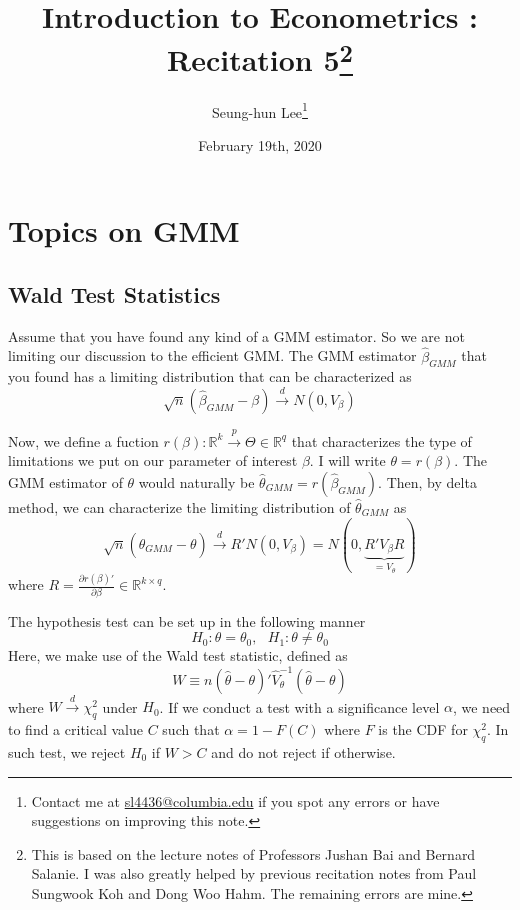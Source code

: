 \documentclass[12pt]{article}
\title{Introduction to Econometrics \ROM{2}: Recitation 5\footnote{This is based on the lecture notes of Professors Jushan Bai and Bernard Salanie. I was also greatly helped by previous recitation notes from Paul Sungwook Koh and Dong Woo Hahm. The remaining errors are mine. }}
\theoremstyle{definition}
\theoremstyle{property}
\theoremstyle{assumption}
\theoremstyle{example}
\theoremstyle{comment}
\begin{document}
\linespread{1.25}
\onehalfspacing

\author{Seung-hun Lee\footnote{Contact me at \href{mailto:sl4436@columbia.edu}{sl4436@columbia.edu} if you spot any errors or have suggestions on improving this note.}}
\date{February 19th, 2020}
\maketitle
\thispagestyle{firstpage}

\section{Topics on GMM}
\subsection{Wald Test Statistics}
Assume that you have found any kind of a GMM estimator. So we are not limiting our discussion to the efficient GMM. The GMM estimator $\hat{\beta}_{GMM}$ that you found has a limiting distribution that can be characterized as
\[
\sqrt{n}(\hat{\beta}_{GMM}-\beta)\xrightarrow{d}N(0,V_\beta)
\]\par
Now, we define a fuction $r(\beta):\mathbb{R}^k\xrightarrow{p} \Theta\in\mathbb{R}^q$ that characterizes the type of limitations we put on our parameter of interest $\beta$. I will write $\theta=r(\beta)$. The GMM estimator of $\theta$ would naturally be $\hat{\theta}_{GMM}=r(\hat{\beta}_{GMM})$. Then, by delta method, we can characterize the limiting distribution of $\hat{\theta}_{GMM}$ as
\[
\sqrt{n}(\hat{\theta}_{GMM}-\theta)\xrightarrow{d}R'N(0,V_\beta) = N(0,\underbrace{R'V_\beta R}_{=V_\theta})
\]
where $R = \frac{\partial r(\beta)'}{\partial \beta}\in\mathbb{R}^{k\times q}$. \par
The hypothesis test can be set up in the following manner
\[
H_0 : \theta= \theta_0, \ \ \ H_1 : \theta \neq \theta_0
\]
Here, we make use of the Wald test statistic, defined as
\[
W\equiv n(\hat{\theta}-\theta)'\widehat{V}_{\theta}^{-1} (\hat{\theta}-\theta)
\]
where $W\xrightarrow{d}\chi_q^2$ under $H_0$. If we conduct a test with a significance level $\alpha$, we need to find a critical value $C$ such that $\alpha=1-F(C)$ where $F$ is the CDF for $\chi^2_{q}$. In such test, we reject $H_0$ if $W>C$ and do not reject if otherwise. \par
\end{document}
